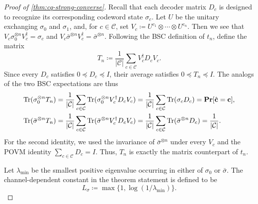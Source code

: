 \documentclass[11pt]{article}
\theoremstyle{remark}
\newcommand{\cC}{\mathcal{C}}
\newcommand{\Tr}{\operatorname{Tr}}
\newcommand{\Prb}{\mathbf{Pr}}
\newcommand{\bchat}{\hat{\mathbf{c}}}
\newcommand{\bc}{\mathbf{c}}
\newcommand{\abs}[1]{\left|#1\right|}
\begin{document}
\begin{proof}[Proof of \cref{thm:cq-strong-converse}]
Recall that each decoder matrix $D_c$ is designed to recognize its corresponding codeword state $\sigma_c$. Let $U$ be the unitary exchanging $\sigma_0$ and $\sigma_1$, and, for $c\in\cC$, set $V_c\coloneqq U^{c_1}\otimes\cdots\otimes U^{c_n}$. Then we see that $V_c\sigma_0^{\otimes n}V_c^\dagger=\sigma_c$ and $V_c\bar{\sigma}^{\otimes n}V_c^\dagger=\bar{\sigma}^{\otimes n}$. Following the BSC definition of $t_n$, define the matrix
\begin{equation*}
T_n \coloneqq \frac{1}{\abs{\cC}}\sum_{c \in \cC}{V_c^\dagger D_cV_c}.
\end{equation*}
Since every $D_c$ satisfies $0\preceq D_c\preceq I$, their average satisfies $0\preceq T_n\preceq I$. The analogs of the two BSC expectations are thus
\begin{align}
\Tr(\sigma_0^{\otimes n}T_n)
&=\frac{1}{\abs{\cC}}\sum_{c\in\cC}{\Tr(\sigma_0^{\otimes n}V_c^\dagger D_cV_c)}
=\frac{1}{\abs{\cC}}\sum_{c\in\cC}{\Tr(\sigma_cD_c)}
=\Prb[\bchat=\bc], \notag\\
\Tr(\bar{\sigma}^{\otimes n}T_n)
&=\frac{1}{\abs{\cC}}\sum_{c\in\cC}{\Tr(\bar{\sigma}^{\otimes n}V_c^\dagger D_cV_c)}
=\frac{1}{\abs{\cC}}\sum_{c\in\cC}{\Tr(\bar{\sigma}^{\otimes n}D_c)}
=\frac{1}{\abs{\cC}}.
\label{eq:symmetrized-decoder}
\end{align}
For the second identity, we used the invariance of $\bar{\sigma}^{\otimes n}$ under every $V_c$ and the POVM identity $\sum_{c\in\cC}{D_c}=I$. Thus, $T_n$ is exactly the matrix counterpart of $t_n$.

Let $\lambda_{\min}$ be the smallest positive eigenvalue occurring in either of $\sigma_0$ or $\bar{\sigma}$. The channel-dependent constant in the theorem statement is defined to be
\begin{equation*}
L_\sigma \coloneqq \max\{1,\log(1/\lambda_{\min})\}.
\end{equation*}


\end{proof}
\end{document}
